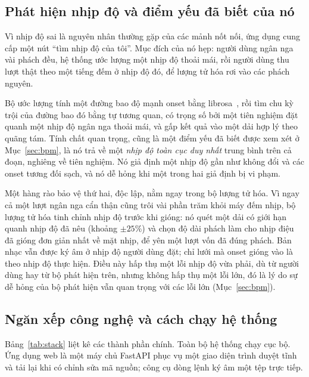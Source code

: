 \documentclass[12pt,a4paper]{article}
\begin{document}
\subsection{Phát hiện nhịp độ và điểm yếu đã biết của nó}
\label{sec:tempo-design}

Vì nhịp độ sai là nguyên nhân thường gặp của các mảnh nốt nối, ứng dụng cung cấp
một nút ``tìm nhịp độ của tôi''. Mục đích của nó hẹp: người dùng ngân nga vài phách
đều, hệ thống ước lượng một nhịp độ thoải mái, rồi người dùng thu lượt thật theo một
tiếng đếm ở nhịp độ đó, để lượng tử hóa rơi vào các phách nguyên.

Bộ ước lượng tính một đường bao độ mạnh onset bằng librosa~\cite{librosa}, rồi tìm
chu kỳ trội của đường bao đó bằng tự tương quan, có trọng số bởi một tiên nghiệm đặt
quanh một nhịp độ ngân nga thoải mái, và gấp kết quả vào một dải hợp lý theo quãng
tám. Tính chất quan trọng, cũng là một điểm yếu đã biết được xem xét ở
Mục~\ref{sec:bpm}, là nó trả về một \emph{nhịp độ toàn cục duy nhất} trung bình trên
cả đoạn, nghiêng về tiên nghiệm. Nó giả định một nhịp độ gần như không đổi và các
onset tương đối sạch, và nó dễ hỏng khi một trong hai giả định bị vi phạm.

Một hàng rào bảo vệ thứ hai, độc lập, nằm ngay trong bộ lượng tử hóa. Vì ngay cả một
lượt ngân nga cẩn thận cũng trôi vài phần trăm khỏi máy đếm nhịp, bộ lượng tử hóa
tinh chỉnh nhịp độ trước khi gióng: nó quét một dải có giới hạn quanh nhịp độ đã nêu
(khoảng $\pm 25\%$) và chọn độ dài phách làm cho nhịp điệu đã gióng đơn giản nhất về
mặt nhịp, để yên một lượt vốn đã đúng phách. Bản nhạc vẫn được ký âm ở nhịp độ người
dùng đặt; chỉ lưới mà onset gióng vào là theo nhịp độ thực hiện. Điều này hấp thụ
một lỗi nhịp độ vừa phải, dù từ người dùng hay từ bộ phát hiện trên, nhưng không hấp
thụ một lỗi lớn, đó là lý do sự dễ hỏng của bộ phát hiện vẫn quan trọng với các lỗi
lớn (Mục~\ref{sec:bpm}).

\subsection{Ngăn xếp công nghệ và cách chạy hệ thống}
\label{sec:stack}

Bảng~\ref{tab:stack} liệt kê các thành phần chính. Toàn bộ hệ thống chạy cục bộ.
Ứng dụng web là một máy chủ FastAPI phục vụ một giao diện trình duyệt tĩnh và tải
lại khi có chỉnh sửa mã nguồn; công cụ dòng lệnh ký âm một tệp trực tiếp.
\end{document}
